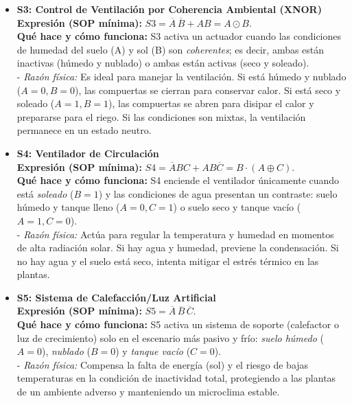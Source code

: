 \begin{itemize}
    \item \textbf{S3: Control de Ventilación por Coherencia Ambiental (XNOR)}\\
    \textbf{Expresión (SOP mínima):} \(\displaystyle S3 = \overline{A}\,\overline{B} + AB = A \odot B\).\\
    \textbf{Qué hace y cómo funciona:} S3 activa un actuador cuando las condiciones de humedad del suelo (A) y sol (B) son \emph{coherentes}; es decir, ambas están inactivas (húmedo y nublado) o ambas están activas (seco y soleado).\\
    - \emph{Razón física:} Es ideal para manejar la ventilación. Si está húmedo y nublado ($A=0, B=0$), las compuertas se cierran para conservar calor. Si está seco y soleado ($A=1, B=1$), las compuertas se abren para disipar el calor y prepararse para el riego. Si las condiciones son mixtas, la ventilación permanece en un estado neutro.
    \item \textbf{S4: Ventilador de Circulación}\\
    \textbf{Expresión (SOP mínima):} \(\displaystyle S4 = \overline{A}BC + AB\overline{C} = B \cdot (A \oplus C)\).\\
    \textbf{Qué hace y cómo funciona:} S4 enciende el ventilador únicamente cuando está \emph{soleado} ($B=1$) y las condiciones de agua presentan un contraste: suelo húmedo y tanque lleno ($A=0, C=1$) o suelo seco y tanque vacío ($A=1, C=0$).\\
    - \emph{Razón física:} Actúa para regular la temperatura y humedad en momentos de alta radiación solar. Si hay agua y humedad, previene la condensación. Si no hay agua y el suelo está seco, intenta mitigar el estrés térmico en las plantas.

    \item \textbf{S5: Sistema de Calefacción/Luz Artificial}\\
    \textbf{Expresión (SOP mínima):} \(\displaystyle S5 = \overline{A}\,\overline{B}\,\overline{C}\).\\
    \textbf{Qué hace y cómo funciona:} S5 activa un sistema de soporte (calefactor o luz de crecimiento) solo en el escenario más pasivo y frío: \emph{suelo húmedo} ($A=0$), \emph{nublado} ($B=0$) y \emph{tanque vacío} ($C=0$).\\
    - \emph{Razón física:} Compensa la falta de energía (sol) y el riesgo de bajas temperaturas en la condición de inactividad total, protegiendo a las plantas de un ambiente adverso y manteniendo un microclima estable.


\end{itemize}
